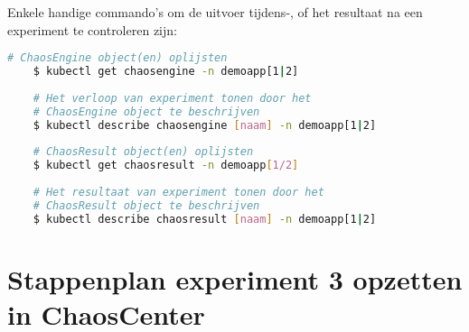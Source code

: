 Enkele handige commando's om de uitvoer tijdens-, of het resultaat na een experiment te controleren zijn:
\begin{lstlisting}[language=bash]
    # ChaosEngine object(en) oplijsten
    $ kubectl get chaosengine -n demoapp[1|2]
    
    # Het verloop van experiment tonen door het 
    # ChaosEngine object te beschrijven
    $ kubectl describe chaosengine [naam] -n demoapp[1|2]
    
    # ChaosResult object(en) oplijsten
    $ kubectl get chaosresult -n demoapp[1/2]
    
    # Het resultaat van experiment tonen door het 
    # ChaosResult object te beschrijven
    $ kubectl describe chaosresult [naam] -n demoapp[1|2]
\end{lstlisting}

\section{Stappenplan experiment 3 opzetten in ChaosCenter}
\label{sec:stappenplan_ex3_chaoscenter}

